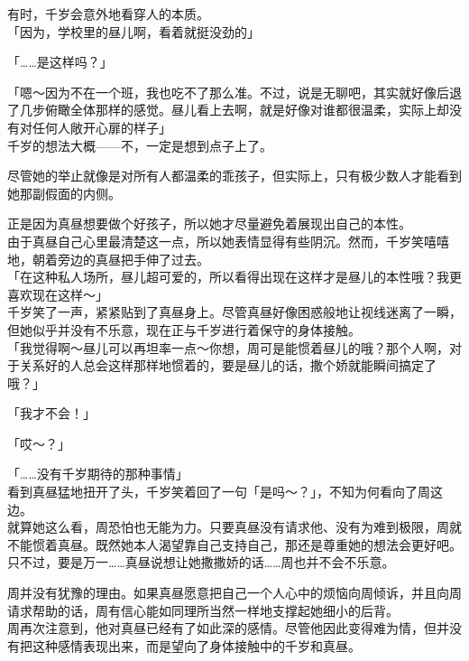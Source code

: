 有时，千岁会意外地看穿人的本质。\\

「因为，学校里的昼儿啊，看着就挺没劲的」

「……是这样吗？」

「嗯～因为不在一个班，我也吃不了那么准。不过，说是无聊吧，其实就好像后退了几步俯瞰全体那样的感觉。昼儿看上去啊，就是好像对谁都很温柔，实际上却没有对任何人敞开心扉的样子」\\

千岁的想法大概——不，一定是想到点子上了。

尽管她的举止就像是对所有人都温柔的乖孩子，但实际上，只有极少数人才能看到她那副假面的内侧。

正是因为真昼想要做个好孩子，所以她才尽量避免着展现出自己的本性。\\

由于真昼自己心里最清楚这一点，所以她表情显得有些阴沉。然而，千岁笑嘻嘻地，朝着旁边的真昼把手伸了过去。\\

「在这种私人场所，昼儿超可爱的，所以看得出现在这样才是昼儿的本性哦？我更喜欢现在这样～」\\

千岁笑了一声，紧紧贴到了真昼身上。尽管真昼好像困惑般地让视线迷离了一瞬，但她似乎并没有不乐意，现在正与千岁进行着保守的身体接触。\\

「我觉得啊～昼儿可以再坦率一点～你想，周可是能惯着昼儿的哦？那个人啊，对于关系好的人总会这样那样地惯着的，要是昼儿的话，撒个娇就能瞬间搞定了哦？」

「我才不会！」

「哎～？」

「……没有千岁期待的那种事情」\\

看到真昼猛地扭开了头，千岁笑着回了一句「是吗～？」，不知为何看向了周这边。\\

就算她这么看，周恐怕也无能为力。只要真昼没有请求他、没有为难到极限，周就不能惯着真昼。既然她本人渴望靠自己支持自己，那还是尊重她的想法会更好吧。\\

只不过，要是万一……真昼说想让她撒撒娇的话……周也并不会不乐意。

周并没有犹豫的理由。如果真昼愿意把自己一个人心中的烦恼向周倾诉，并且向周请求帮助的话，周有信心能如同理所当然一样地支撑起她细小的后背。\\

周再次注意到，他对真昼已经有了如此深的感情。尽管他因此变得难为情，但并没有把这种感情表现出来，而是望向了身体接触中的千岁和真昼。\\

